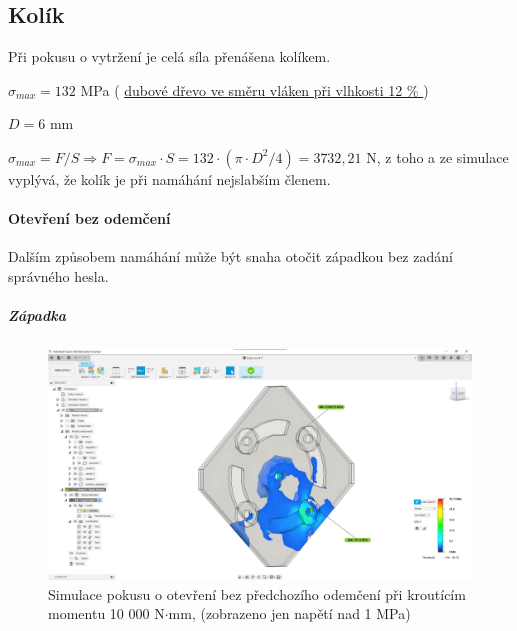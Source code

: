 \subsection{Kolík}
Při pokusu o vytržení je celá síla přenášena kolíkem.

\begin{table}[h]
    \centering
    \caption{Tabulka značení veličin pro napětí v kolíku v tahu}
    \label{tab:M3_symboly_kolik}
\end{table}

$ \sigma_{max} = 132  $ MPa    ( \href{https://is.mendelu.cz/eknihovna/opory/zobraz_cast.pl?fit_w=1;cast=9190}{dubové dřevo ve směru vláken při vlhkosti 12 \% }\parencite{pevnost_dreva}) %

$D = 6$ mm

 \(\sigma_{max} = F/S \Rightarrow F = \sigma_{max} \cdot S = 132 \cdot (\pi \cdot D^2/4) = 3 732,21 \) N,  z toho a ze simulace vyplývá, že kolík je při namáhání nejslabším členem.

\paragraph{Otevření bez odemčení}
Dalším způsobem namáhání může být snaha otočit západkou bez zadání správného hesla.

\subparagraph{Západka}

\begin{figure}[h]
    \centering
    \includegraphics[width=\textwidth]{kapitoly/obrazky/M3/simulace/odolnost_proti_nasilnemu_odemceni_10Nm.png}
    \caption{Simulace pokusu o otevření bez předchozího odemčení při kroutícím momentu 10 000 N$\cdot$mm, (zobrazeno jen napětí nad 1 MPa) \centering}
    \label{fig:M3-simulace-zapadka}
\end{figure}

